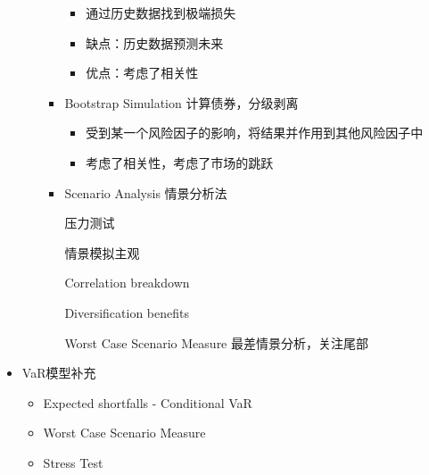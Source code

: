 \documentclass[a4paper,6pt,twoside,openany]{article}
\begin{document}
\begin{itemize}
\begin{itemize}
\begin{itemize}
    \begin{itemize}
    \item 通过历史数据找到极端损失
    \item 缺点：历史数据预测未来
      \item 优点：考虑了相关性
    \end{itemize}
  \item Bootstrap Simulation 计算债券，分级剥离
    \begin{itemize}
    \item 受到某一个风险因子的影响，将结果并作用到其他风险因子中
    \item 考虑了相关性，考虑了市场的跳跃
    \end{itemize}
  \item Scenario Analysis 情景分析法
    \par 压力测试
    \par 情景模拟主观
    \par Correlation breakdown
    \par Diversification benefits
    \par Worst Case Scenario Measure 最差情景分析，关注尾部
  \end{itemize}
\end{itemize}
\item VaR模型补充
  \begin{itemize}
  \item Expected shortfalls - Conditional VaR
  \item Worst Case Scenario Measure
  \item Stress Test
  \end{itemize}
\end{itemize}
\end{document}
